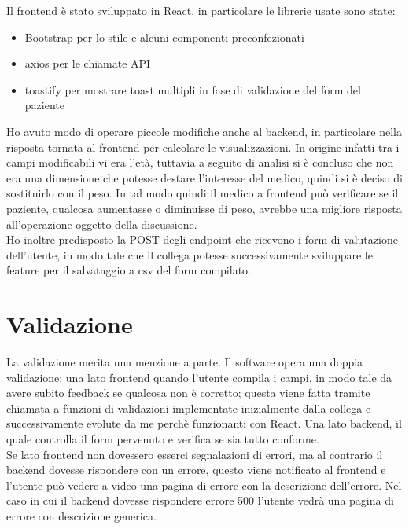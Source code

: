 Il frontend è stato sviluppato in React, in particolare le librerie usate sono state:
\begin{itemize}
    \item Bootstrap per lo stile e alcuni componenti preconfezionati
    \item axios per le chiamate API
    \item toastify per mostrare toast multipli in fase di validazione del form del paziente
\end{itemize}

Ho avuto modo di operare piccole modifiche anche al backend, in particolare nella risposta tornata al frontend per calcolare le visualizzazioni. In origine infatti tra i campi modificabili vi era l'età, tuttavia a seguito di analisi si è concluso che non era una dimensione che potesse destare l'interesse del medico, quindi si è deciso di sostituirlo con il peso. In tal modo quindi il medico a frontend può verificare se il paziente, qualcosa aumentasse o diminuisse di peso, avrebbe una migliore risposta all'operazione oggetto della discussione.\\ 
Ho inoltre predisposto la POST degli endpoint che ricevono i form di valutazione dell'utente, in modo tale che il collega potesse successivamente sviluppare le feature per il salvataggio a csv del form compilato.\\ 

\section{Validazione}
La validazione merita una menzione a parte. Il software opera una doppia validazione: una lato frontend quando l'utente compila i campi, in modo tale da avere subito feedback se qualcosa non è corretto; questa viene fatta tramite chiamata a funzioni di validazioni implementate inizialmente dalla collega e successivamente evolute da me perchè funzionanti con React. Una lato backend, il quale controlla il form pervenuto e verifica se sia tutto conforme.\\
Se lato frontend non dovessero esserci segnalazioni di errori, ma al contrario il backend dovesse rispondere con un errore, questo viene notificato al frontend e l'utente può vedere a video una pagina di errore con la descrizione dell'errore. Nel caso in cui il backend dovesse rispondere errore 500 l'utente vedrà una pagina di errore con descrizione generica. 

